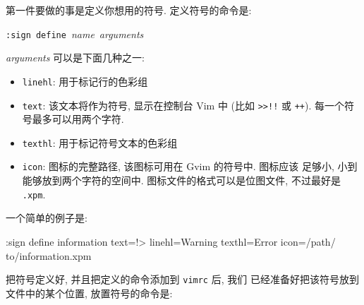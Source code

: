 第一件要做的事是定义你想用的符号. 定义符号的命令是:
\begin{vimcmdform}
\texttt{:sign define}\ \textit{name}\ \textit{arguments}
\end{vimcmdform}
\textit{arguments} 可以是下面几种之一:
\begin{itemize}
    \item \texttt{linehl}: 用于标记行的色彩组
    \item \texttt{text}: 该文本将作为符号, 显示在控制台 Vim 中 (比如
        \texttt{>>!!} 或 \texttt{++}). 每一个符号最多可以用两个字符.
    \item \texttt{texthl}: 用于标记符号文本的色彩组
    \item \texttt{icon}: 图标的完整路径, 该图标可用在 Gvim 的符号中. 图标应该
        足够小, 小到能够放到两个字符的空间中. 图标文件的格式可以是位图文件,
        不过最好是 \texttt{.xpm}.
\end{itemize}
一个简单的例子是:
\begin{vimcode}
:sign define information text=!> linehl=Warning texthl=Error icon=/path/
to/information.xpm
\end{vimcode}
把符号定义好, 并且把定义的命令添加到 \texttt{vimrc} 后, 我们
已经准备好把该符号放到文件中的某个位置, 放置符号的命令是:
